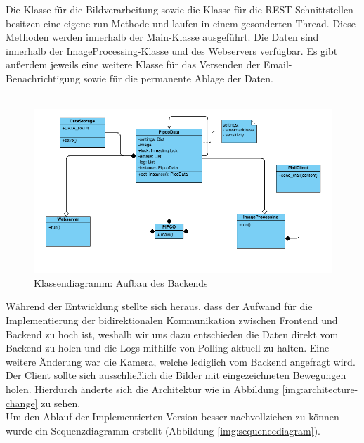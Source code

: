 Die Klasse für die Bildverarbeitung sowie die Klasse für die REST-Schnittstellen besitzen eine eigene run-Methode und laufen in einem gesonderten Thread. Diese Methoden werden innerhalb der Main-Klasse ausgeführt. Die Daten sind innerhalb der ImageProcessing-Klasse und des Webservers verfügbar. Es gibt außerdem jeweils eine weitere Klasse für das Versenden der Email-Benachrichtigung sowie für die permanente Ablage der Daten.\\\\
\begin{figure}[]
	\centering
	\includegraphics[width=\textwidth]{content/pictures/classdiagramm.png}
	\caption{Klassendiagramm: Aufbau des Backends}
	\label{img:backend-classdiagramm}
\end{figure}

Während der Entwicklung stellte sich heraus, dass der Aufwand für die Implementierung der bidirektionalen Kommunikation zwischen Frontend und Backend zu hoch ist, weshalb wir uns dazu entschieden die Daten direkt vom Backend zu holen und die Logs mithilfe von Polling aktuell zu halten.
Eine weitere Änderung war die Kamera, welche lediglich vom Backend angefragt wird. Der Client sollte sich ausschließlich die Bilder mit eingezeichneten Bewegungen holen.
Hierdurch änderte sich die Architektur wie in Abbildung \ref{img:architecture-change} zu sehen.\\

Um den Ablauf der Implementierten Version besser nachvollziehen zu können wurde ein Sequenzdiagramm erstellt (Abbildung \ref{img:sequencediagram}).

